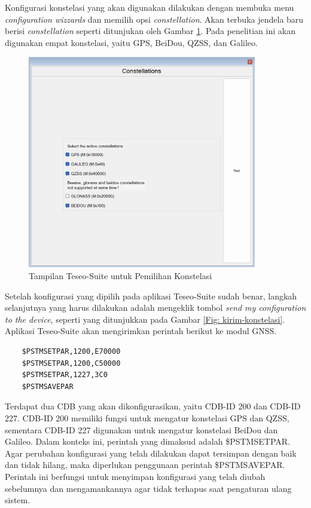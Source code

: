 Konfigurasi konstelasi yang akan digunakan dilakukan dengan membuka menu \textit{configuration wizzards} dan memilih opsi \textit{constellation}. Akan terbuka jendela baru berisi \textit{constellation} seperti ditunjukan oleh Gambar \ref{Fig: pilih-konstelasi}. Pada penelitian ini akan digunakan empat konstelasi, yaitu GPS, BeiDou, QZSS, dan Galileo.

\begin{figure}[H]
	\centering
	\includegraphics[width=10cm]{contents/chapter-3/setting-konstelasi/pilih-konfigurasi.png}
	\caption{Tampilan Teseo-Suite untuk Pemilihan Konstelasi}
	\label{Fig: pilih-konstelasi}
\end{figure}


Setelah konfigurasi yang dipilih pada aplikasi Teseo-Suite sudah benar, langkah selanjutnya yang harus dilakukan adalah mengeklik tombol \textit{send my configuration to the device}, seperti yang ditunjukkan pada Gambar \ref{Fig: kirim-konstelasi}. Aplikasi Teseo-Suite akan mengirimkan perintah berikut ke modul GNSS.

\begin{verbatim}
	$PSTMSETPAR,1200,E70000
	$PSTMSETPAR,1200,C50000
	$PSTMSETPAR,1227,3C0
	$PSTMSAVEPAR
\end{verbatim}

Terdapat dua CDB yang akan dikonfigurasikan, yaitu CDB-ID 200 dan CDB-ID 227. CDB-ID 200 memiliki fungsi untuk mengatur konstelasi GPS dan QZSS, sementara CDB-ID 227 digunakan untuk mengatur konstelasi BeiDou dan Galileo. Dalam konteks ini, perintah yang dimaksud adalah \$PSTMSETPAR. Agar perubahan konfigurasi yang telah dilakukan dapat tersimpan dengan baik dan tidak hilang, maka diperlukan penggunaan perintah \$PSTMSAVEPAR. Perintah ini berfungsi untuk menyimpan konfigurasi yang telah diubah sebelumnya dan mengamankannya agar tidak terhapus saat pengaturan ulang sistem. 

